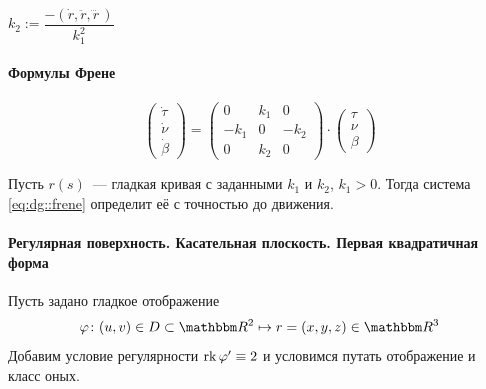 \documentclass[draft,timbord]{longnotes}
\begin{document}
\begin{defn}[Кручение]\label{defn:dg::norm::crvn}
  $k_2 := \dfrac{-(\dot r, \ddot r, \dddot r\,)}{k_1^2}$
\end{defn}

\paragraph{Формулы Френе}
\label{par:dg::frene}

\begin{thrm}\label{thrm:dg::frene}
  \begin{equation}
    \label{eq:dg::frene}
    \begin{pmatrix}
      \dot\tau \\\dot\nu \\ \dot\beta
    \end{pmatrix}
    = 
    \begin{pmatrix}
      0 & k_1 & 0 \\
      -k_1 & 0 & -k_2 \\
      0 & k_2 & 0
    \end{pmatrix}\cdot
    \begin{pmatrix}
      \tau \\ \nu \\ \beta
    \end{pmatrix}
  \end{equation}
\end{thrm}

\begin{thrm}\label{thrm:dg::frene::reconst}
  Пусть $r(s)$~--- гладкая кривая с заданными $k_1$ и $k_2$, $k_1>0$. 
  Тогда система \eqref{eq:dg::frene} определит её с точностью до движения.
\end{thrm}

\paragraph{Регулярная поверхность. Касательная плоскость. Первая квадратичная форма}
\label{par:dg::tangplane}

\begin{defn}\label{defn:dg::tangplane::manifold}
  Пусть задано гладкое отображение \[
    \varphi \colon (u,v) \in D \subset \R^2 \mapsto r=(x,y,z) \in \R^3
  \]
  Добавим условие регулярности $\operatorname{rk} \varphi' \equiv 2$ и условимся путать отображение и класс 
  оных.
\end{defn}
\end{document}
